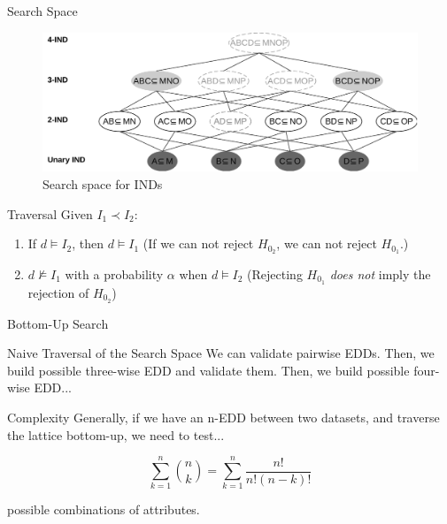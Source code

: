 \documentclass[10pt]{beamer}
\begin{document}
\begin{frame}{Search Space}
\begin{figure}
    \centering
    \includegraphics[width=\textwidth]{lattice.pdf}
    \caption{Search space for INDs}
\end{figure}
\end{frame}

\begin{frame}{Traversal}
    Given $I_1 \prec I_2$:
    
    \begin{enumerate}
        \item If $d \models I_2$, then $d \models I_1$ (If we can not reject $H_{0_2}$, we can not reject $H_{0_1}$.)
        \item $d \not\models I_1$ with a probability $\alpha$ when $d \models I_2$
            (Rejecting $H_{0_1}$ \emph{does not} imply the rejection of $H_{0_2}$)
    \end{enumerate}


\end{frame}

\begin{frame}{Bottom-Up Search}
    \begin{block}{Naive Traversal of the Search Space}
        \smallskip
        We can validate pairwise EDDs. Then, we build possible three-wise EDD and validate them.
        Then, we build possible four-wise EDD...
    \end{block}
        
    \begin{alertblock}{Complexity}
    \smallskip
    Generally, if we have an n-EDD between two datasets, and traverse the lattice bottom-up, we need
    to test...
    
    \begin{equation*}
        \sum_{k=1}^{n}{\binom{n}{k}} = \sum_{k=1}^{n} \frac{n!}{n!(n - k)!}
    \end{equation*}
    
    possible combinations of attributes.
    \end{alertblock}
\end{frame}
\end{document}
